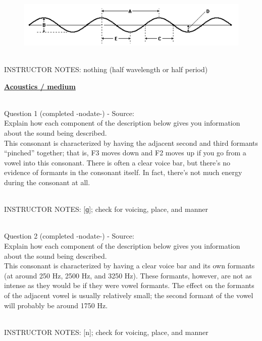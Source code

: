 \documentclass[12pt]{article}
\begin{document}
\begin{figure}[H]
\includegraphics{../images/sinusoid.png}
\end{figure}

~\\
INSTRUCTOR NOTES: nothing (half wavelength or half period)


\newpage\textbf{\underline{\huge Acoustics / medium\\}}

~\\

{\large Question 1} (completed -nodate-) - Source: \\

Explain how each component of the description below gives you information about the sound being described.\\

This consonant is characterized by having the adjacent second and third formants “pinched” together; that is, F3 moves down and F2 moves up if you go from a vowel into this consonant. There is often a clear voice bar, but there’s no evidence of formants in the consonant itself. In fact, there’s not much energy during the consonant at all.


~\\
INSTRUCTOR NOTES: [ɡ]; check for voicing, place, and manner


~\\

{\large Question 2} (completed -nodate-) - Source: \\

Explain how each component of the description below gives you information about the sound being described.\\

This consonant is characterized by having a clear voice bar and its own formants (at around 250 Hz, 2500 Hz, and 3250 Hz). These formants, however, are not as intense as they would be if they were vowel formants. The effect on the formants of the adjacent vowel is usually relatively small; the second formant of the vowel will probably be around 1750 Hz.


~\\
INSTRUCTOR NOTES: [n]; check for voicing, place, and manner
\end{document}
